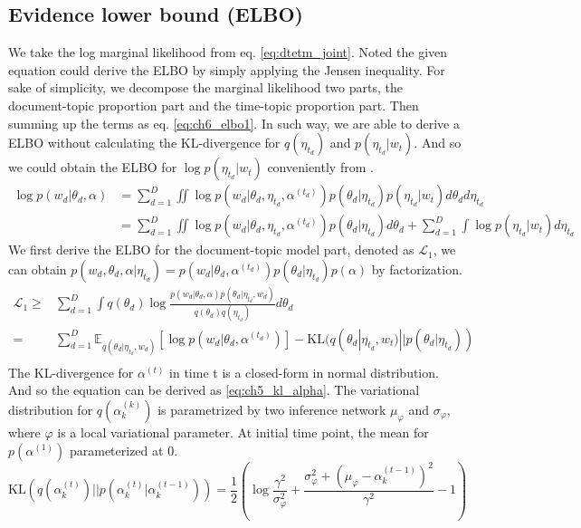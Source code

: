 \subsection{Evidence lower bound (ELBO)}
We take the log marginal likelihood from eq. \ref{eq:dtetm_joint}. Noted the given equation could derive the ELBO by simply applying the Jensen inequality. For sake of simplicity, we decompose the marginal likelihood two parts, the document-topic proportion part and the time-topic proportion part. Then summing up the terms as eq. \ref{eq:ch6_elbo1}. In such way, we are able to derive a ELBO without calculating the KL-divergence for $ q(\eta_{t_d}) $ and $ p(\eta_{t_d}|w_t) $. And so we could obtain the ELBO for $ \log p(\eta_{t_d}|w_t) $ conveniently from \cite{titsias_bayesian_nodate}.
\begin{align}\label{eq:ch6_elbo1}
\log p(w_d|\theta_d,\alpha)&=\sum_{d=1}^{D}\iint\log p(w_d|\theta_d,\eta_{t_d},\alpha^{(t_d)})p(\theta_d|\eta_{t_d})p(\eta_{t_d}|w_t)d\theta_{d}d\eta_{t_d}\\
&=\sum_{d=1}^{D}\iint\log p(w_d|\theta_d,\eta_{t_d},\alpha^{(t_d)})p(\theta_d|\eta_{t_d})d\theta_{d}+\sum_{d=1}^{D}\int\log p(\eta_{t_d}|w_t)d\eta_{t_d}
\end{align}
We first derive the ELBO for the document-topic model part, denoted as $ \mathcal{L}_{1} $, we can obtain $ p(w_d,\theta_d,\alpha|\eta_{t_d})=p(w_d|\theta_d,\alpha^{(t_d)})p(\theta_{d}|\eta_{t_d})p(\alpha)$ by factorization. 
\begin{align}\label{eq:ch5_elbo_p1}
\mathcal{L}_{1}\geq&\sum_{d=1}^{D}\int q(\theta_d)\log\frac{p(w_d|\theta_{d},\alpha)p(\theta_d|\eta_{t_d},w_d)}{q(\theta_d)q(\eta_{t_d})}d\theta_d\\
=&\sum_{d=1}^{D}\mathbb{E}_{ q(\theta_d|\eta_{t_d},w_d)}[\log p(w_{d}|\theta_d,\alpha^{(t_d)})]-\text{KL}(q(\theta_d|\eta_{t_d},w_t)||p(\theta_d|\eta_{t_d}))\\
\end{align}
The KL-divergence for $ \alpha^{(t)} $ in time t is a closed-form in normal distribution. And so the equation can be derived as \ref{eq:ch5_kl_alpha}. The variational distribution for $ q(\alpha_k^{(k)}) $ is parametrized by two inference network $ \mu_{\varphi} $ and $ \sigma_{\varphi} $, where $ \varphi $ is a local variational parameter.
At initial time point, the mean for $ p(\alpha^{(1)}) $ parameterized at 0.
\begin{equation}\label{eq:ch5_kl_alpha}
\text{KL}(q(\alpha_k^{(t)})||p(\alpha_k^{(t)}|\alpha^{(t-1)}_k))=\frac{1}{2}\left(\log\frac{\gamma^2}{\sigma_\varphi^2}+\frac{\sigma_\varphi^2+(\mu_\varphi-\alpha_k^{(t-1)})^2}{\gamma^2}-1\right)
\end{equation}
